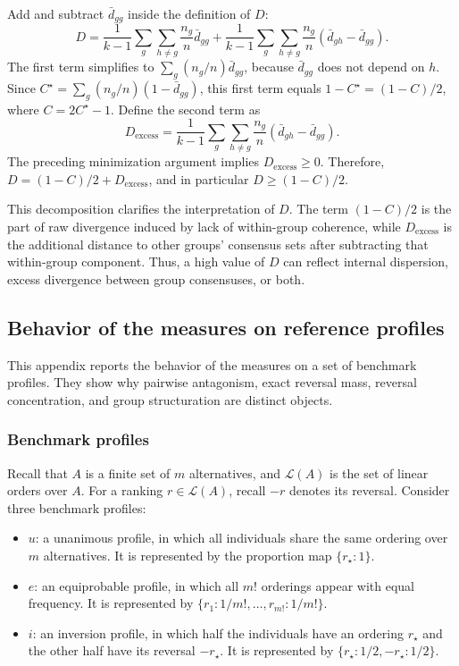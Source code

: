 \documentclass[12pt]{article}
\begin{document}
Add and subtract \(\bar d_{gg}\) inside the definition of \(D\):
\[
D
=
\frac{1}{k-1}\sum_g\sum_{h\neq g}\frac{n_g}{n}\bar d_{gg}
+
\frac{1}{k-1}\sum_g\sum_{h\neq g}\frac{n_g}{n}
\left(\bar d_{gh}-\bar d_{gg}\right).
\]
The first term simplifies to \(\sum_g(n_g/n)\bar d_{gg}\), because
\(\bar d_{gg}\) does not depend on \(h\). Since
\(C^{\star}=\sum_g(n_g/n)(1-\bar d_{gg})\), this first term equals
\(1-C^{\star}=(1-C)/2\), where \(C=2C^{\star}-1\). Define the second term as
\[
D_{\mathrm{excess}}
=
\frac{1}{k-1}\sum_g\sum_{h\neq g}\frac{n_g}{n}
\left(\bar d_{gh}-\bar d_{gg}\right).
\]
The preceding minimization argument implies \(D_{\mathrm{excess}}\geq 0\).
Therefore, \(D=(1-C)/2+D_{\mathrm{excess}}\), and in particular
\(D\geq (1-C)/2\).

This decomposition clarifies the interpretation of \(D\). The term
\((1-C)/2\) is the part of raw divergence induced by lack of within-group
coherence, while \(D_{\mathrm{excess}}\) is the additional distance to other
groups' consensus sets after subtracting that within-group component. Thus, a
high value of \(D\) can reflect internal dispersion, excess divergence between
group consensuses, or both.

\subsection{Behavior of the measures on reference profiles}
\label{app:measures-action}

This appendix reports the behavior of the measures on a set of benchmark
profiles. They show why pairwise antagonism, exact reversal mass, reversal
concentration, and group structuration are distinct objects.

\subsubsection{Benchmark profiles}

Recall that \(A\) is a finite set of \(m\) alternatives, and \(\mathcal{L}(A)\) is
the set of linear orders over \(A\). For a ranking \(r\in\mathcal{L}(A)\), recall
\(-r\) denotes its reversal. Consider three benchmark profiles:
\begin{itemize}
  \item \(u\): a unanimous profile, in which all individuals share the same
  ordering over \(m\) alternatives. It is represented by the proportion map
  \(\{r_{\star}:1\}\).

  \item \(e\): an equiprobable profile, in which all \(m!\) orderings appear
  with equal frequency. It is represented by
  \(\{r_1:1/m!,\ldots,r_{m!}:1/m!\}\).

  \item \(i\): an inversion profile, in which half the individuals have an
  ordering \(r_{\star}\) and the other half have its reversal \(-r_{\star}\).
  It is represented by
  \(\{r_{\star}:1/2,-r_{\star}:1/2\}\).
\end{itemize}
\end{document}
